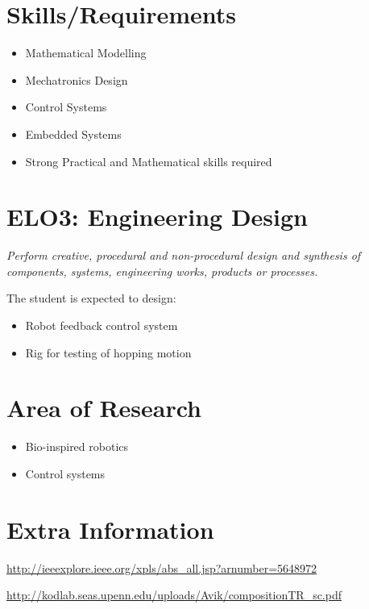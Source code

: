 \section*{Skills/Requirements}

\begin{itemize}
\item Mathematical Modelling 
\item Mechatronics Design
\item Control Systems
\item Embedded Systems
\item Strong Practical and Mathematical skills required
\end{itemize}

\section*{ELO3: Engineering Design}

\textit{Perform creative, procedural and non-procedural design and synthesis of components, systems, engineering works, products or processes.}

The student is expected to design:

\begin{itemize}
\item Robot feedback control system
\item Rig for testing of hopping motion
\end{itemize}

\section*{Area of Research}

\begin{itemize}
\item Bio-inspired robotics
\item Control systems
\end{itemize}

\section*{Extra Information}

\url{http://ieeexplore.ieee.org/xpls/abs_all.jsp?arnumber=5648972}

\url{http://kodlab.seas.upenn.edu/uploads/Avik/compositionTR_sc.pdf}
